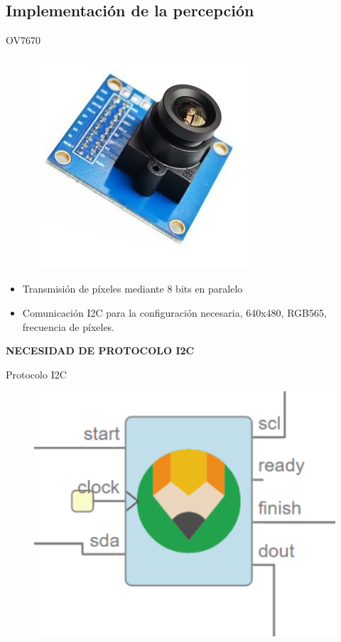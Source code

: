 \documentclass{beamer}
\begin{document}
\subsection{Implementación de la percepción}

\begin{frame}{OV7670}
\begin{figure}[H]
	\center
	\includegraphics[scale=0.2, angle=0]{imagenes/Cuadricoptero_vision/OV7670}
\end{figure}
\begin{block}{}
	\begin{itemize}
		\item Transmisión de píxeles mediante 8 bits en paralelo
		\item Comunicación I2C para la configuración necesaria, 640x480, RGB565, frecuencia de píxeles.
	\end{itemize}
\end{block}
\begin{alertblock}{}
		\centering \textbf{NECESIDAD DE PROTOCOLO I2C} \pause
\end{alertblock}
\end{frame}

\begin{frame}{Protocolo I2C}
\begin{figure}[H]
	\center
	\includegraphics[scale=0.4, angle=0]{imagenes/Cuadricoptero_vision/I2C_write.PNG}
\end{figure}
\end{frame}
\end{document}
